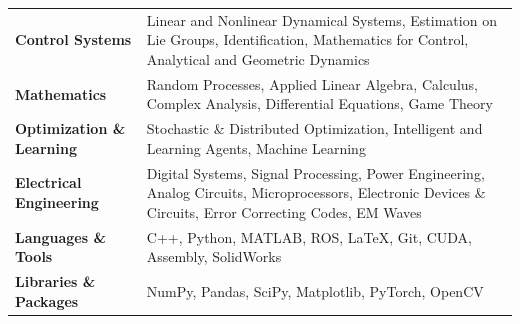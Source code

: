 \documentclass[10pt,letterpaper,sans]{moderncv}        %
\newcommand\x{1}
\begin{document}
\vspace{\x pt}
\begin{tabular}{p{4.2cm} p{13.3cm}}
    \textbf{Control Systems} & Linear and Nonlinear Dynamical Systems, Estimation on Lie Groups, Identification, Mathematics for Control, Analytical and Geometric Dynamics \\
    \textbf{Mathematics} & Random Processes, Applied Linear Algebra, Calculus, Complex Analysis, Differential Equations, Game Theory \\
    \textbf{Optimization \& Learning} & Stochastic \& Distributed Optimization, Intelligent and Learning Agents, Machine Learning\\
    \textbf{Electrical Engineering} & Digital Systems, Signal Processing, Power Engineering, Analog Circuits, Microprocessors, Electronic Devices \& Circuits, Error Correcting Codes, EM Waves\\
    \textbf{Languages \& Tools} &  C++, Python, MATLAB, ROS, \LaTeX, Git, CUDA, Assembly, SolidWorks\\
    \textbf{Libraries \& Packages} & NumPy, Pandas, SciPy, Matplotlib, PyTorch, OpenCV
\end{tabular}

\end{document}
